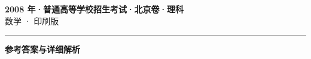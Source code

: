 \documentclass[zihao=5, a4paper]{ctexart}
\begin{document}
\begin{center}
  {\Large\bfseries 2008 年·普通高等学校招生考试·北京卷·理科}\\[4pt]
  {\large 数学 · 印刷版}
\end{center}
\medskip
{}

\par\bigskip\hrule\bigskip
{}
\begin{center}{\large\bfseries 参考答案与详细解析}\end{center}
\smallskip

\end{document}
